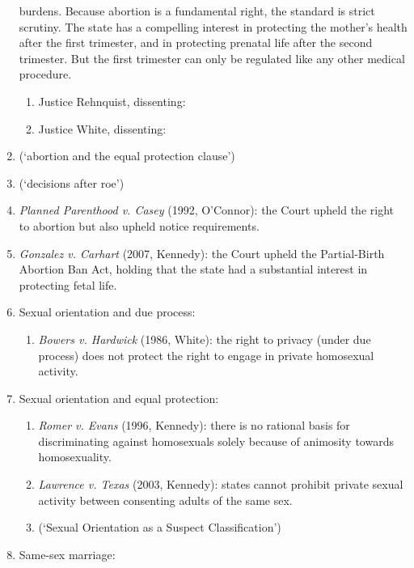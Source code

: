 \begin{enumerate}
    burdens. Because abortion is a fundamental right, the standard is strict 
    scrutiny. The state has a compelling interest in protecting the mother's 
    health after the first trimester, and in protecting prenatal life after 
    the second trimester. But the first trimester can only be regulated like 
    any other medical procedure.
    \begin{enumerate}
        \item Justice Rehnquist, dissenting: %
        \item Justice White, dissenting: %
    \end{enumerate}
    \item (`abortion and the equal protection clause') %
    \item (`decisions after roe') %
    \item \emph{Planned Parenthood v. Casey} (1992, O'Connor): the Court 
    upheld the right to abortion but also upheld notice requirements.
    \item \emph{Gonzalez v. Carhart} (2007, Kennedy): the Court upheld the 
    Partial-Birth Abortion Ban Act, holding that the state had a substantial 
    interest in protecting fetal life. %
    \item Sexual orientation and due process:
    \begin{enumerate}
        \item \emph{Bowers v.  Hardwick} (1986, White): the right to privacy 
        (under due process) does not protect the right to engage in private 
        homosexual activity. %
    \end{enumerate}
    \item Sexual orientation and equal protection:
    \begin{enumerate}
        \item \emph{Romer v. Evans} (1996, Kennedy): there is no rational 
        basis for discriminating against homosexuals solely because of 
        animosity towards homosexuality. %
        \item \emph{Lawrence v. Texas} (2003, Kennedy): states cannot prohibit 
        private sexual activity between consenting adults of the same sex. 
        \item (`Sexual Orientation as a Suspect Classification') %
    \end{enumerate}
    \item Same-sex marriage:
    \begin{enumerate}

\end{enumerate}
\end{enumerate}
